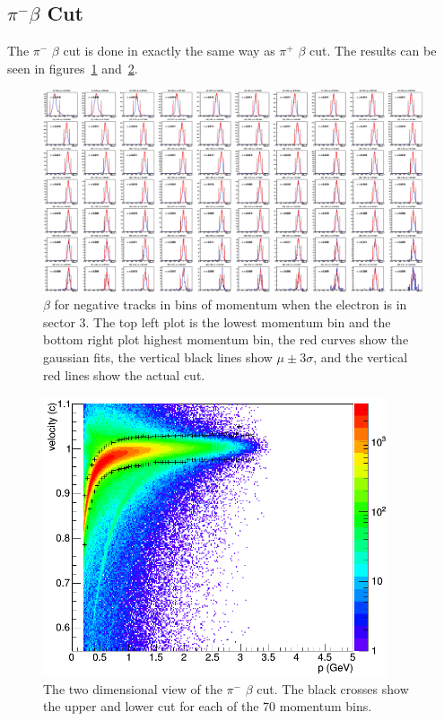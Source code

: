 \subsection{$\pi^- \beta$ Cut}
The $\pi^-$ $\beta$ cut is done in exactly the same way as $\pi^+$ $\beta$ cut.
The results can be seen in figures~\ref{fig:neg_1Dbeta_pBins} and~\ref{fig:pim_vvpCut}.
%
\begin{figure}
\centering
\includegraphics[width=8.5in]{figures/neg_1Dbeta_pBins.png}
\caption{$\beta$ for negative tracks in bins of momentum when the electron is in sector 3. The top left plot is the lowest momentum bin and the bottom right plot highest momentum bin, the red curves show the gaussian fits, the vertical black lines show $\mu \pm 3\sigma$, and the vertical red lines show the actual cut.}
\label{fig:neg_1Dbeta_pBins}
\end{figure}
%
\begin{figure}[htp]
\centering
\includegraphics[width=4in]{figures/pim_vvpCut.png}
\caption{The two dimensional view of the $\pi^-$ $\beta$ cut. The black crosses show the upper and lower cut for each of the 70 momentum bins.}
\label{fig:pim_vvpCut}
\end{figure}
%
%
